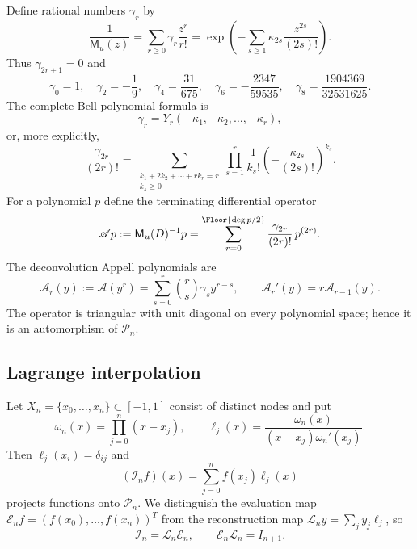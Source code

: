 \documentclass[11pt,oneside]{article}
\numberwithin{equation}{section}
\theoremstyle{definition}
\theoremstyle{remark}
\newcommand{\PiN}{\mathcal P}
\newcommand{\App}{\mathscr A}
\newcommand{\MGF}{\mathsf M}
\newcommand{\Lag}{\mathcal I}
\newcommand{\Eval}{\mathcal E}
\newcommand{\Rec}{\mathcal L}
\newcommand{\Bell}{Y}
\begin{document}
Define rational numbers $\gamma_r$ by
\begin{equation}
 \frac1{\MGF_u(z)}=\sum_{r\ge0}\gamma_r\frac{z^r}{r!}
 =\exp\!\left(-\sum_{s\ge1}\kappa_{2s}
                     \frac{z^{2s}}{(2s)!}\right).
 \label{eq:gamma-egf}
\end{equation}
Thus $\gamma_{2r+1}=0$ and
\begin{equation}
 \gamma_0=1,
 \quad \gamma_2=-\frac19,
 \quad \gamma_4=\frac{31}{675},
 \quad \gamma_6=-\frac{2347}{59535},
 \quad \gamma_8=\frac{1904369}{32531625}.
 \label{eq:gamma-first}
\end{equation}
The complete Bell-polynomial formula is
\begin{equation}
 \gamma_r=\Bell_r(-\kappa_1,-\kappa_2,\ldots,-\kappa_r),
 \label{eq:gamma-bell}
\end{equation}
or, more explicitly,
\begin{equation}
 \frac{\gamma_{2r}}{(2r)!}
 =\sum_{\substack{k_1+2k_2+\cdots+rk_r=r\\k_s\ge0}}
   \prod_{s=1}^{r}\frac1{k_s!}
   \left(-\frac{\kappa_{2s}}{(2s)!}\right)^{k_s}.
 \label{eq:gamma-partition}
\end{equation}
For a polynomial $p$ define the terminating differential operator
\begin{equation}
 \App p:=\MGF_u(D)^{-1}p
 =\sum_{r=0}^{\Floor{\deg p/2}}
   \frac{\gamma_{2r}}{(2r)!}\,p^{(2r)}.
 \label{eq:App-operator}
\end{equation}
The deconvolution Appell polynomials are
\begin{equation}
 \mathcal A_r(y):=\App(y^r)
 =\sum_{s=0}^{r}\binom rs\gamma_s y^{r-s},
 \qquad \mathcal A_r'(y)=r\mathcal A_{r-1}(y).
 \label{eq:Appell-polynomials}
\end{equation}
The operator is triangular with unit diagonal on every polynomial space;
hence it is an automorphism of $\PiN_n$.

\subsection{Lagrange interpolation}

Let $X_n=\{x_0,\ldots,x_n\}\subset[-1,1]$ consist of distinct nodes and put
\begin{equation}
 \omega_n(x)=\prod_{j=0}^{n}(x-x_j),
 \qquad
 \ell_j(x)=\frac{\omega_n(x)}{(x-x_j)\omega_n'(x_j)}.
 \label{eq:lagrange-cardinal}
\end{equation}
Then $\ell_j(x_i)=\delta_{ij}$ and
\begin{equation}
 (\Lag_nf)(x)=\sum_{j=0}^{n}f(x_j)\ell_j(x)
 \label{eq:interpolant}
\end{equation}
projects functions onto $\PiN_n$.  We distinguish the evaluation map
$\Eval_n f=(f(x_0),\ldots,f(x_n))^T$ from the reconstruction map
$\Rec_n y=\sum_jy_j\ell_j$, so
\begin{equation}
 \Lag_n=\Rec_n\Eval_n,
 \qquad \Eval_n\Rec_n=I_{n+1}.
 \label{eq:Lagrange-factor}
\end{equation}
\end{document}
